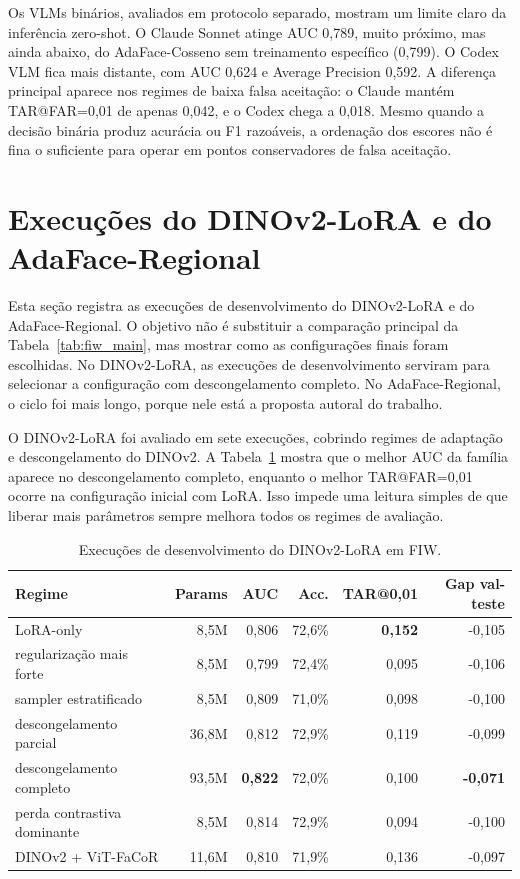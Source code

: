Os VLMs binários, avaliados em protocolo separado, mostram um limite claro da inferência zero-shot. O Claude Sonnet atinge AUC 0,789, muito próximo, mas ainda abaixo, do AdaFace-Cosseno sem treinamento específico (0,799). O Codex VLM fica mais distante, com AUC 0,624 e Average Precision 0,592. A diferença principal aparece nos regimes de baixa falsa aceitação: o Claude mantém TAR@FAR=0,01 de apenas 0,042, e o Codex chega a 0,018. Mesmo quando a decisão binária produz acurácia ou F1 razoáveis, a ordenação dos escores não é fina o suficiente para operar em pontos conservadores de falsa aceitação.

\section{Execuções do DINOv2-LoRA e do AdaFace-Regional}

Esta seção registra as execuções de desenvolvimento do DINOv2-LoRA e do AdaFace-Regional. O objetivo não é substituir a comparação principal da Tabela~\ref{tab:fiw_main}, mas mostrar como as configurações finais foram escolhidas. No DINOv2-LoRA, as execuções de desenvolvimento serviram para selecionar a configuração com descongelamento completo. No AdaFace-Regional, o ciclo foi mais longo, porque nele está a proposta autoral do trabalho.

O DINOv2-LoRA foi avaliado em sete execuções, cobrindo regimes de adaptação e descongelamento do DINOv2. A Tabela~\ref{tab:dinov2_lora_execucoes} mostra que o melhor AUC da família aparece no descongelamento completo, enquanto o melhor TAR@FAR=0,01 ocorre na configuração inicial com LoRA. Isso impede uma leitura simples de que liberar mais parâmetros sempre melhora todos os regimes de avaliação.

\begin{table}[h]
\centering
\scriptsize
\setlength{\tabcolsep}{3pt}
\caption{Execuções de desenvolvimento do DINOv2-LoRA em FIW.}
\label{tab:dinov2_lora_execucoes}
\begin{tabular}{lrrrrr}
\hline
\textbf{Regime} & \textbf{Params} & \textbf{AUC} & \textbf{Acc.} & \textbf{TAR@0,01} & \textbf{Gap val-teste} \\
\hline
LoRA-only                     & 8{,}5M  & 0{,}806 & 72{,}6\% & \textbf{0{,}152} & -0{,}105 \\
regularização mais forte      & 8{,}5M  & 0{,}799 & 72{,}4\% & 0{,}095          & -0{,}106 \\
sampler estratificado         & 8{,}5M  & 0{,}809 & 71{,}0\% & 0{,}098          & -0{,}100 \\
descongelamento parcial       & 36{,}8M & 0{,}812 & 72{,}9\% & 0{,}119          & -0{,}099 \\
descongelamento completo      & 93{,}5M & \textbf{0{,}822} & 72{,}0\% & 0{,}100 & \textbf{-0{,}071} \\
perda contrastiva dominante   & 8{,}5M  & 0{,}814 & 72{,}9\% & 0{,}094          & -0{,}100 \\
DINOv2 + ViT-FaCoR            & 11{,}6M & 0{,}810 & 71{,}9\% & 0{,}136          & -0{,}097 \\
\hline
\end{tabular}
\end{table}

